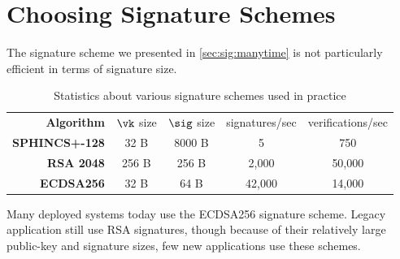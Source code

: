 \section{Choosing Signature Schemes}
The signature scheme we presented in \cref{sec:sig:manytime}
is not particularly efficient in terms of signature size.

\begin{table}[htpb]
	\centering
	\caption{Statistics about various signature schemes used in practice}
	\label{tab:sig_schemes}

	\begin{tabular}{rcccc}
		\textbf{Algorithm} & $\vk$ size & $\sig$ size & signatures/sec & verifications/sec \\
		\bf{SPHINCS+-128} & 32 B & 8000 B & 5 & 750 \\
		\bf{RSA 2048} & 256 B & 256 B & 2,000 & 50,000 \\
		\bf{ECDSA256} & 32 B & 64 B & 42,000 & 14,000 \\
	\end{tabular}
\end{table}

Many deployed systems today use the ECDSA256 signature scheme.
Legacy application still use RSA signatures, though because of their
relatively large public-key and signature sizes, few new applications
use these schemes.
